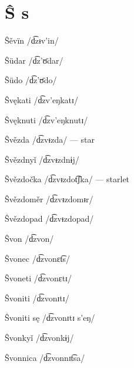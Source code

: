 \chapter{Ŝ s}

Ŝěvïn /d͡zᵻv’in/

Ŝüdar /d͡z’ʊ̈dar/

Ŝüdo /d͡z’ʊ̈do/

Ŝvękati /d͡zv’eŋkatɪ/

Ŝvęknuti /d͡zv’eŋknutɪ/

Ŝvězda /d͡zvᵻzda/ — star

Ŝvězdnyǐ /d͡zvᵻzdnɨj/

Ŝvězdočka /d͡zvᵻzdot͡ʃka/ — starlet

Ŝvězdoměr /d͡zvᵻzdomᵻr/

Ŝvězdopad /d͡zvᵻzdopad/

Ŝvon /d͡zvon/

Ŝvonec /d͡zvonɛt͡s/

Ŝvoneti /d͡zvonɛtɪ/

Ŝvoniti /d͡zvonɪtɪ/

Ŝvoniti sę /d͡zvonɪtɪ s’eŋ/

Ŝvonkyǐ /d͡zvonkɨj/

Ŝvonnica /d͡zvonnɪt͡sa/
